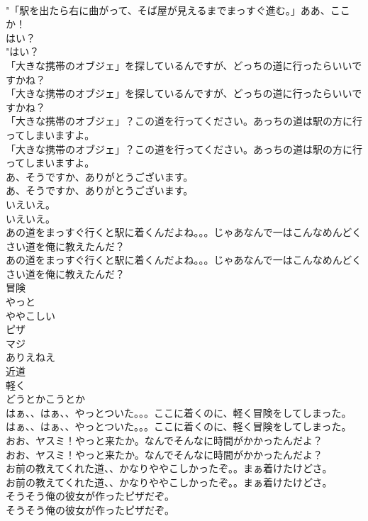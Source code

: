\documentclass[8pt]{extreport}
\begin{document}
\begin{CJK}{UTF8}{min}
\\	"「駅を出たら右に曲がって、そば屋が見えるまでまっすぐ進む。」ああ、ここか！ 
\\	はい？	
\\	"はい？ 
\\	「大きな携帯のオブジェ」を探しているんですが、どっちの道に行ったらいいですかね？	
\\	「大きな携帯のオブジェ」を探しているんですが、どっちの道に行ったらいいですかね？ 
\\	「大きな携帯のオブジェ」？この道を行ってください。あっちの道は駅の方に行ってしまいますよ。	
\\	「大きな携帯のオブジェ」？この道を行ってください。あっちの道は駅の方に行ってしまいますよ。 
\\	あ、そうですか、ありがとうございます。	
\\	あ、そうですか、ありがとうございます。 
\\	いえいえ。	
\\	いえいえ。 
\\	あの道をまっすぐ行くと駅に着くんだよね。。。じゃあなんで一はこんなめんどくさい道を俺に教えたんだ？	
\\	あの道をまっすぐ行くと駅に着くんだよね。。。じゃあなんで一はこんなめんどくさい道を俺に教えたんだ？ 
\\	冒険
\\	やっと
\\	ややこしい
\\	ピザ
\\	マジ
\\	ありえねえ
\\	近道
\\	軽く
\\	どうとかこうとか
\\	はぁ、、はぁ、、やっとついた。。。ここに着くのに、軽く冒険をしてしまった。	
\\	はぁ、、はぁ、、やっとついた。。。ここに着くのに、軽く冒険をしてしまった。 
\\	おお、ヤスミ！やっと来たか。なんでそんなに時間がかかったんだよ？	
\\	おお、ヤスミ！やっと来たか。なんでそんなに時間がかかったんだよ？ 
\\	お前の教えてくれた道、、かなりややこしかったぞ。。まぁ着けたけどさ。	
\\	お前の教えてくれた道、、かなりややこしかったぞ。。まぁ着けたけどさ。 
\\	そうそう俺の彼女が作ったピザだぞ。	
\\	そうそう俺の彼女が作ったピザだぞ。 

\end{CJK}
\end{document}
